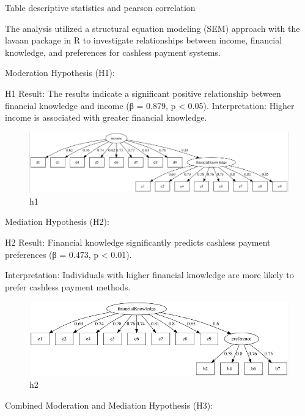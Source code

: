 \documentclass[
  super,
  preprint,
  3p]{elsarticle}
\begin{document}
Table descriptive statistics and pearson correlation

The analysis utilized a structural equation modeling (SEM) approach with
the lavaan package in R to investigate relationships between income,
financial knowledge, and preferences for cashless payment systems.

Moderation Hypothesis (H1):

H1 Result: The results indicate a significant positive relationship
between financial knowledge and income (β = 0.879, p \textless{} 0.05).
Interpretation: Higher income is associated with greater financial
knowledge.

\begin{figure}

{\centering \includegraphics{plot.png}

}

\caption{h1}

\end{figure}

Mediation Hypothesis (H2):

H2 Result: Financial knowledge significantly predicts cashless payment
preferences (β = 0.473, p \textless{} 0.01).

Interpretation: Individuals with higher financial knowledge are more
likely to prefer cashless payment methods.

\begin{figure}

{\centering \includegraphics{plot2.png}

}

\caption{h2}

\end{figure}

Combined Moderation and Mediation Hypothesis (H3):
\end{document}
